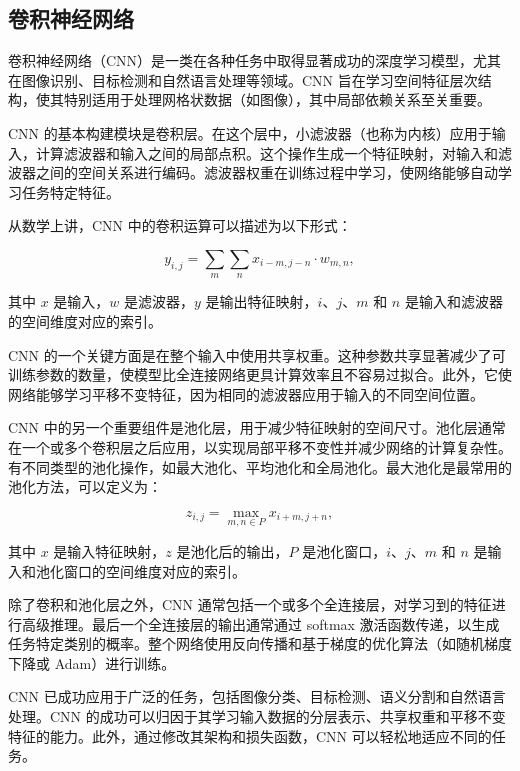 \subsection{卷积神经网络}
卷积神经网络（CNN）是一类在各种任务中取得显著成功的深度学习模型，尤其在图像识别、目标检测和自然语言处理等领域。CNN 旨在学习空间特征层次结构，使其特别适用于处理网格状数据（如图像），其中局部依赖关系至关重要\cite{chua1993cnn}。

CNN 的基本构建模块是卷积层。在这个层中，小滤波器（也称为内核）应用于输入，计算滤波器和输入之间的局部点积。这个操作生成一个特征映射，对输入和滤波器之间的空间关系进行编码\cite{he2016deep}。滤波器权重在训练过程中学习，使网络能够自动学习任务特定特征。

从数学上讲，CNN 中的卷积运算可以描述为以下形式：

\begin{equation}
  y_{i,j} = \sum_{m} \sum_{n} x_{i-m, j-n} \cdot w_{m,n},
\end{equation}

其中 $x$ 是输入，$w$ 是滤波器，$y$ 是输出特征映射，$i$、$j$、$m$ 和 $n$ 是输入和滤波器的空间维度对应的索引。

CNN 的一个关键方面是在整个输入中使用共享权重。这种参数共享显著减少了可训练参数的数量，使模型比全连接网络更具计算效率且不容易过拟合。此外，它使网络能够学习平移不变特征，因为相同的滤波器应用于输入的不同空间位置。

CNN 中的另一个重要组件是池化层，用于减少特征映射的空间尺寸。池化层通常在一个或多个卷积层之后应用，以实现局部平移不变性并减少网络的计算复杂性。有不同类型的池化操作，如最大池化、平均池化和全局池化。最大池化是最常用的池化方法，可以定义为：

\begin{equation}
  z_{i,j} = \max_{m,n \in P} x_{i+m, j+n},
\end{equation}

其中 $x$ 是输入特征映射，$z$ 是池化后的输出，$P$ 是池化窗口，$i$、$j$、$m$ 和 $n$ 是输入和池化窗口的空间维度对应的索引。

除了卷积和池化层之外，CNN 通常包括一个或多个全连接层，对学习到的特征进行高级推理。最后一个全连接层的输出通常通过 softmax 激活函数传递，以生成任务特定类别的概率。整个网络使用反向传播和基于梯度的优化算法（如随机梯度下降或 Adam）进行训练。

CNN 已成功应用于广泛的任务，包括图像分类、目标检测、语义分割和自然语言处理。CNN 的成功可以归因于其学习输入数据的分层表示、共享权重和平移不变特征的能力。此外，通过修改其架构和损失函数，CNN 可以轻松地适应不同的任务\cite{albawi2017understanding}。

